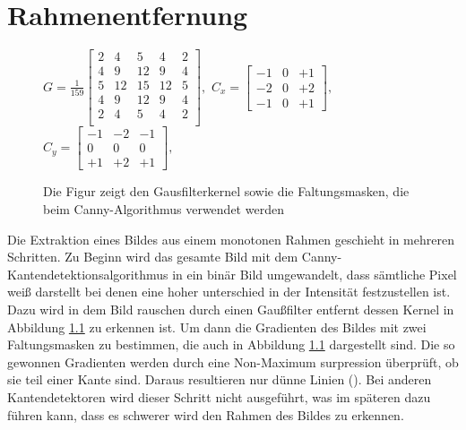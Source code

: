 \chapter{Rahmenentfernung}

\begin{figure}[h]
 	$
 	G = \frac{1}{159}
	\begin{bmatrix}
		2 & 4 & 5 & 4 & 2 \\ 
		4 & 9 & 12 & 9 & 4 \\
		5 & 12 & 15 & 12 & 5 \\
		4 & 9 & 12 & 9 & 4 \\
		2 & 4 & 5 & 4 & 2 \\
	\end{bmatrix},	
	$
	$
	C_x = 
	\begin{bmatrix}
	-1 & 0 & +1 \\
	-2 & 0 & +2 \\
	-1 & 0 & +1
	\end{bmatrix},
	$
	$	
	C_y = 
	\begin{bmatrix}
	-1 & -2 & -1 \\
	0 & 0 & 0 \\
	+1 & +2 & +1
	\end{bmatrix},
	$
\caption{Die Figur zeigt den Gausfilterkernel sowie die Faltungsmasken, die beim Canny-Algorithmus verwendet werden}
\label{fig:gauss}
\end{figure}

Die Extraktion eines Bildes aus einem monotonen Rahmen geschieht in mehreren Schritten. Zu Beginn wird das gesamte Bild mit dem Canny-Kantendetektionsalgorithmus in ein binär Bild umgewandelt, dass sämtliche Pixel weiß darstellt bei denen eine hoher unterschied in der Intensität festzustellen ist. Dazu wird in dem Bild rauschen durch einen Gaußfilter entfernt dessen Kernel in Abbildung \ref{fig:gauss} zu erkennen ist. Um dann die Gradienten des Bildes mit zwei Faltungsmasken zu bestimmen, die auch in Abbildung \ref{fig:gauss} dargestellt sind. Die so gewonnen Gradienten werden durch eine Non-Maximum surpression überprüft, ob sie teil einer Kante sind. Daraus resultieren nur dünne Linien (\cite{OpenCVCanny}). Bei anderen Kantendetektoren wird dieser Schritt nicht ausgeführt, was im späteren dazu führen kann, dass es schwerer wird den Rahmen des Bildes zu erkennen.
 
